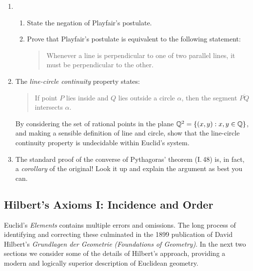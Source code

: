 \begin{exercises}
\begin{enumerate}
	  
	  \item\begin{enumerate}
	    \item State the negation of Playfair's postulate.
	    \item Prove that Playfair's postulate is equivalent to the following statement:
	  \begin{quote}
	  	Whenever a line is perpendicular to one of two parallel lines, it must be perpendicular to the other.
	  \end{quote}
	  \end{enumerate}
	 
	  
	  \item\label{ex:euclidundecideable} The \emph{line-circle continuity} property states:
	  \begin{quote}
	  If point $P$ lies inside and $Q$ lies outside a circle $\alpha$, then the segment $\overline{PQ}$ intersects $\alpha$.
	  \end{quote}
	  By considering the set of rational points in the plane $\mathbb{Q}^2=\{(x,y):x,y\in\mathbb{Q}\}$, and making a sensible definition of line and circle, show that the line-circle continuity property is undecidable within Euclid's system.
		
		
		\item The standard proof of the converse of Pythagoras' theorem (I.\,48) is, in fact, a \emph{corollary} of the original! Look it up and explain the argument as best you can.
	\end{enumerate}
	
\end{exercises}

\clearpage



\subsection{Hilbert's Axioms I: Incidence and Order}\label{sec:hilbert1}

Euclid's \emph{Elements} contains multiple errors and omissions. The long process of identifying and correcting these culminated in the 1899 publication of David Hilbert's \emph{Grundlagen der Geometrie (Foundations of Geometry)}. In the next two sections we consider some of the details of Hilbert's approach, providing a modern and logically superior description of Euclidean geometry.\smallbreak

